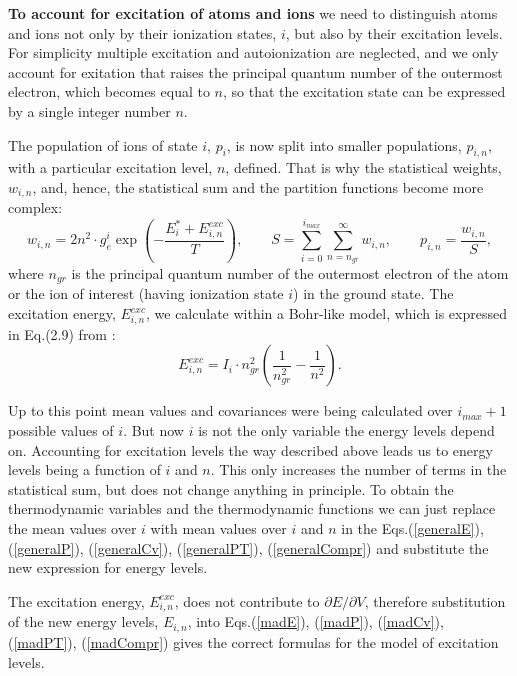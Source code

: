 {\bf To account for excitation of atoms and ions} we need to distinguish atoms and ions
not only by their ionization states, $i$, but also by their excitation levels.
For simplicity multiple excitation and autoionization are neglected,
and we only account for exitation that raises the principal quantum number of the
outermost electron, which becomes equal to $n$, so that the excitation state
can be expressed by a single integer number $n$.

The population of ions of state $i$, $p_i$, is now split into smaller populations, $p_{i,n}$,
with a particular excitation level, $n$, defined.
That is why the statistical weights, $w_{i,n}$, and, hence, the statistical sum and the partition functions
become more complex:
\begin{equation}
w_{i,n} = 2 n^2 \cdot g_e^i \exp \left( -\frac{E^*_i + E^{exc}_{i,n}}{T} \right),\qquad
S = \sum_{i=0}^{i_{max}} \sum_{n=n_{gr}}^{\infty} w_{i,n},\qquad
p_{i,n} = \frac{w_{i,n}}{S},
\end{equation}
where $n_{gr}$ is the principal quantum number of the outermost electron
of the atom or the ion of interest (having ionization state $i$) in the ground state.
The excitation energy, $E^{exc}_{i,n}$, we calculate within a Bohr-like model, which is expressed in
Eq.(2.9) from \cite{ionmix}:
\begin{equation}
E^{exc}_{i,n} = I_i \cdot n_{gr}^2 \left( \frac1{n_{gr}^2} - \frac1{n^2} \right).
\end{equation}

Up to this point mean values and covariances were being calculated over $i_{max}+1$ possible
values of $i$. But now $i$ is not the only variable the energy levels depend on.
Accounting for excitation levels the way described above leads us to energy levels
being a function of $i$ and $n$.
This only increases the number of terms in the statistical sum, but does not change
anything in principle. To obtain the thermodynamic variables and the thermodynamic functions
we can just replace the mean values over $i$ with mean values over $i$ and $n$ in the
Eqs.(\ref{generalE}), (\ref{generalP}), (\ref{generalCv}),
(\ref{generalPT}), (\ref{generalCompr}) and substitute the new expression for energy levels.

The excitation energy, $E^{exc}_{i,n}$, does not contribute to $\partial E / \partial V$,
therefore substitution of the new energy levels, $E_{i,n}$, into
Eqs.(\ref{madE}), (\ref{madP}), (\ref{madCv}), (\ref{madPT}), (\ref{madCompr})
gives the correct formulas for the model of excitation levels.

